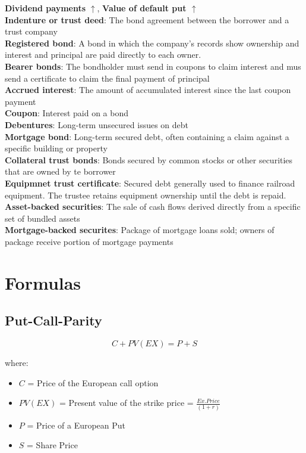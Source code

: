 \documentclass{cheatsheet}
\begin{document}
    \textbf{Dividend payments} \textbf{$\uparrow$}, \textbf{Value of default put $\uparrow$}\\
    \textbf{Indenture or trust deed}: The bond agreement between the borrower and a trust company\\
    \textbf{Registered bond}: A bond in which the company's records show ownership and interest and principal are paid directly to each owner.\\
    \textbf{Bearer bonds}: The bondholder must send in coupons to claim interest and mus send a certificate to claim the final payment of principal\\
    \textbf{Accrued interest}: The amount of accumulated interest since the last coupon payment\\
    \textbf{Coupon}: Interest paid on a bond\\
    \textbf{Debentures}: Long-term unsecured issues on debt\\
    \textbf{Mortgage bond}: Long-term secured debt, often containing a claim against a specific building or property\\
    \textbf{Collateral trust bonds}: Bonds secured by common stocks or other securities that are owned by te borrower\\
    \textbf{Equipmnet trust certificate}: Secured debt generally used to finance railroad equipment. The trustee retains equipment ownership until the debt is repaid.\\
    \textbf{Asset-backed securities}: The sale of cash flows derived directly from a specific set of bundled assets\\
    \textbf{Mortgage-backed securites}: Package of mortgage loans sold; owners of package receive portion of mortgage payments\\


\section*{Formulas}
\subsection{Put-Call-Parity}
    \[
C + PV(EX) = P + S
\]

\noindent where:
\begin{itemize}
  \item $C$ = Price of the European call option
  \item $PV(EX)$ = Present value of the strike price = $\frac{Ex.Price}{(1+r)}$
  \item $P$ = Price of a European Put
  \item $S$ = Share Price
\end{itemize}
\end{document}
